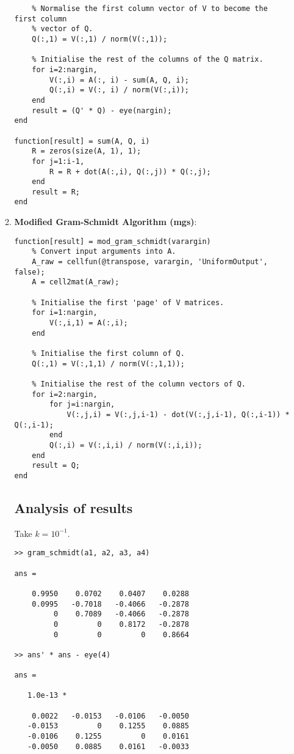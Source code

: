 \documentclass{article}
\begin{document}
\begin{enumerate}
\begin{enumerate}
\begin{verbatim}
    % Normalise the first column vector of V to become the first column
    % vector of Q.
    Q(:,1) = V(:,1) / norm(V(:,1));
    
    % Initialise the rest of the columns of the Q matrix.
    for i=2:nargin,
        V(:,i) = A(:, i) - sum(A, Q, i);
        Q(:,i) = V(:, i) / norm(V(:,i));
    end
    result = (Q' * Q) - eye(nargin);
end

function[result] = sum(A, Q, i)
    R = zeros(size(A, 1), 1);
    for j=1:i-1,
        R = R + dot(A(:,i), Q(:,j)) * Q(:,j);
    end    
    result = R;
end
		\end{verbatim}
		\item \textbf{Modified Gram-Schmidt Algorithm (mgs)}:
		\begin{verbatim}
function[result] = mod_gram_schmidt(varargin)
    % Convert input arguments into A.
    A_raw = cellfun(@transpose, varargin, 'UniformOutput', false);  
    A = cell2mat(A_raw);
    
    % Initialise the first 'page' of V matrices.
    for i=1:nargin,
        V(:,i,1) = A(:,i);
    end
    
    % Initialise the first column of Q.
    Q(:,1) = V(:,1,1) / norm(V(:,1,1));
    
    % Initialise the rest of the column vectors of Q.
    for i=2:nargin,
        for j=i:nargin,
            V(:,j,i) = V(:,j,i-1) - dot(V(:,j,i-1), Q(:,i-1)) * Q(:,i-1);
        end
        Q(:,i) = V(:,i,i) / norm(V(:,i,i));
    end    
    result = Q;
end

		\end{verbatim}
		\subsection*{Analysis of results}
		Take $k = 10^{-1}$.
		\begin{verbatim}
>> gram_schmidt(a1, a2, a3, a4)

ans =

    0.9950    0.0702    0.0407    0.0288
    0.0995   -0.7018   -0.4066   -0.2878
         0    0.7089   -0.4066   -0.2878
         0         0    0.8172   -0.2878
         0         0         0    0.8664
         
>> ans' * ans - eye(4)

ans =

   1.0e-13 *

    0.0022   -0.0153   -0.0106   -0.0050
   -0.0153         0    0.1255    0.0885
   -0.0106    0.1255         0    0.0161
   -0.0050    0.0885    0.0161   -0.0033
         

\end{verbatim}
\end{enumerate}
\end{enumerate}
\end{document}
